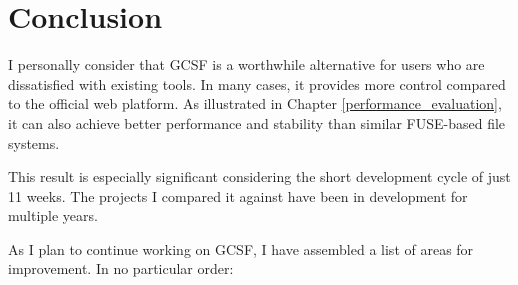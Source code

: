 \chapter{Conclusion}\label{conclusion}

I personally consider that GCSF is a worthwhile alternative for users who are dissatisfied with existing tools. In many cases, it provides more control compared to the official web platform. As illustrated in Chapter \ref{performance_evaluation}, it can also achieve better performance and stability than similar FUSE-based file systems.

This result is especially significant considering the short development cycle of just 11 weeks. The projects I compared it against have been in development for multiple years.

As I plan to continue working on GCSF, I have assembled a list of areas for improvement. In no particular order:

